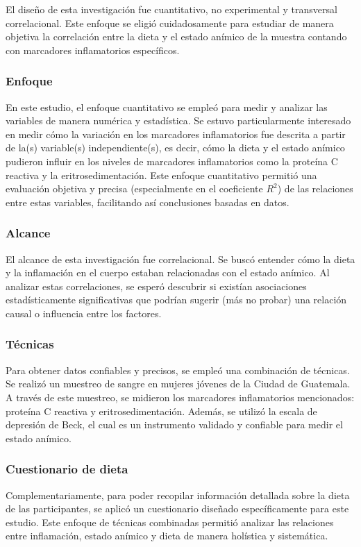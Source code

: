\documentclass[jou]{apa7}
\begin{document}
	El diseño de esta investigación fue cuantitativo, no experimental y
	transversal correlacional. Este enfoque se eligió cuidadosamente para
	estudiar de manera objetiva la correlación entre la dieta y el estado
	anímico de la muestra contando con marcadores inflamatorios
	específicos.\\

	\subsubsection{Enfoque} En este estudio, el enfoque cuantitativo se empleó para
	medir y analizar las variables de manera numérica y estadística. Se
	estuvo particularmente interesado en medir cómo la variación en los
	marcadores inflamatorios fue descrita a partir de la(s) variable(s)
	independiente(s), es decir, cómo la dieta y el estado anímico pudieron
	influir en los niveles de marcadores inflamatorios como la proteína C
	reactiva y la eritrosedimentación. Este enfoque cuantitativo permitió una
	evaluación objetiva y precisa (especialmente en el coeficiente
	\emph{$R^2$}) de las relaciones entre estas variables, facilitando así
	conclusiones basadas en datos.\\

	\subsubsection{Alcance}
	El alcance de esta investigación fue correlacional.
	Se buscó entender cómo la dieta y la inflamación en el cuerpo estaban relacionadas
	con el estado anímico. Al analizar estas correlaciones, se
	esperó descubrir si existían asociaciones estadísticamente significativas
	que podrían sugerir (más no probar) una relación causal o influencia
	entre los factores.

	\subsubsection{Técnicas}
	Para obtener datos confiables y precisos, se empleó una combinación de técnicas. Se realizó un muestreo de sangre en mujeres jóvenes de la Ciudad de Guatemala. A través de este muestreo, se midieron los marcadores inflamatorios mencionados: proteína C reactiva y eritrosedimentación. Además, se utilizó la escala de depresión de Beck, el cual es un instrumento validado y confiable para medir el estado anímico.

	\subsubsection{Cuestionario de dieta}
	Complementariamente, para poder recopilar información detallada sobre la dieta de las participantes, se aplicó un cuestionario diseñado específicamente para este estudio. Este enfoque de técnicas combinadas permitió analizar las relaciones entre inflamación, estado anímico y dieta de manera holística y sistemática.
\end{document}

